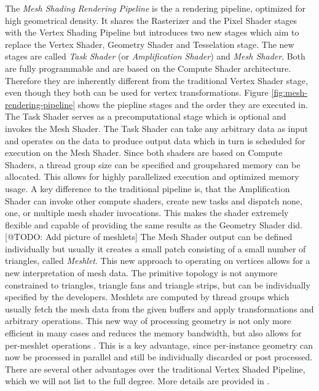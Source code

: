 The \emph{Mesh Shading Rendering Pipeline} is the a rendering pipeline, optimized for high geometrical 
density. It shares the Rasterizer and the Pixel Shader stages with the Vertex Shading Pipeline but 
introduces two new stages which aim to replace the Vertex Shader, Geometry Shader and Tesselation stage.
The new stages are called \emph{Task Shader} (or \emph{Amplification Shader}) and \emph{Mesh Shader}. Both 
are fully programmable and are based on the Compute Shader architecture. Therefore they are inherently different 
from the traditional Vertex Shader stage, even though they both can be used for vertex transformations.
Figure \ref{fig:mesh-rendering-pipeline} shows the piepline stages and the order they are executed in. \\

\noindent
The Task Shader serves as a precomputational stage which is optional and invokes the Mesh Shader.
The Task Shader can take any arbitrary data as input and operates on the data to produce output data which in 
turn is scheduled for execution on the Mesh Shader. Since both shaders are based on Compute Shaders, a thread 
group size can be specified and groupshared memory can be allocated. This allows for highly parallelized execution 
and optimized memory usage. A key difference to the traditional pipeline is, that the Amplification Shader can 
invoke other compute shaders, create new tasks and dispatch none, one, or multiple mesh shader invocations. This 
makes the shader extremely flexible and capable of providing the same results as the Geometry Shader did.\\

[@TODO: Add picture of meshlets]
\noindent
The Mesh Shader output can be defined individually but usually it creates a small patch consisting of a small 
number of triangles, called \emph{Meshlet}. This new approach to operating on vertices allows for a new interpretation 
of mesh data. The primitive topology is not anymore constrained to triangles, triangle fans and triangle strips, 
but can be individually specified by the developers.
Meshlets are computed by thread groups which usually fetch the mesh data from the given buffers and apply 
transformations and arbitrary operations. This new way of processing geometry is not only more efficient in many cases 
and reduces the memory bandwidth, but also allows for per-meshlet operations \cite{Kubisch2020}. This is a key 
advantage, since per-instance geometry can now be processed in parallel and still be individually discarded or post 
processed. There are several other advantages over the traditional Vertex Shaded Pipeline, which we will not list to 
the full degree. More details are provided in \cite{Kubisch2020}.\\


